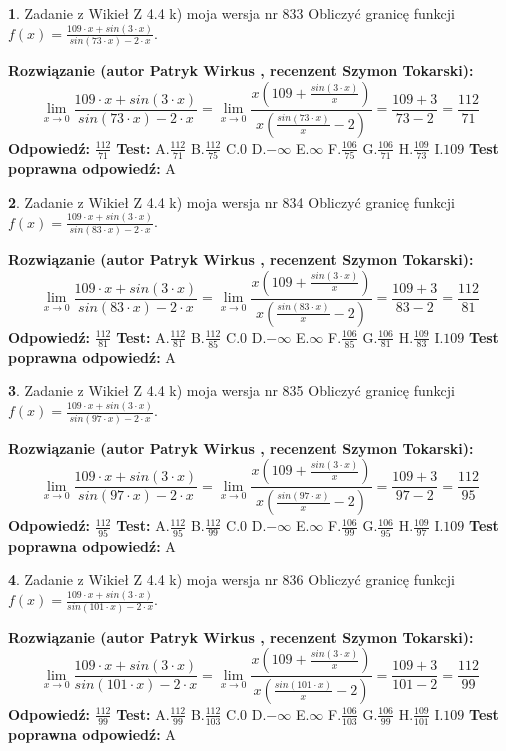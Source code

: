 \documentclass[12pt, a4paper]{article}
\theoremstyle{definition} %
\newtheorem{zad}{}
\newcommand{\zadStart}[1]{\begin{zad}#1\newline}
\newcommand{\zadStop}{\end{zad}}
\newcommand{\rozwStart}[2]{\noindent \textbf{Rozwiązanie (autor #1 , recenzent #2): }\newline}
\newcommand{\rozwStop}{\newline}
\newcommand{\odpStart}{\noindent \textbf{Odpowiedź:}\newline}
\newcommand{\odpStop}{\newline}
\newcommand{\testStart}{\noindent \textbf{Test:}\newline}
\newcommand{\testStop}{\newline}
\newcommand{\kluczStart}{\noindent \textbf{Test poprawna odpowiedź:}\newline}
\newcommand{\kluczStop}{\newline}
\begin{document}
\zadStart{Zadanie z Wikieł Z 4.4 k) moja wersja nr 833}
Obliczyć granicę funkcji $f(x)=\frac{109\cdot x +sin(3\cdot x)}{sin(73\cdot x) -2\cdot x}$.
\zadStop
\rozwStart{Patryk Wirkus}{Szymon Tokarski}
$$\lim\limits_{x\to 0}\frac{109\cdot x +sin(3\cdot x)}{sin(73\cdot x) -2\cdot x}
=\lim\limits_{x\to 0}\frac{x(109+\frac{sin(3\cdot x)}{x})}{x(\frac{sin(73\cdot x)}{x}-2)}
=\frac{109+3}{73-2} = \frac{112}{71}$$
\rozwStop
\odpStart
$\frac{112}{71}$
\odpStop
\testStart
A.$\frac{112}{71}$
B.$\frac{112}{75}$
C.$0$
D.$-\infty$
E.$\infty$
F.$\frac{106}{75}$
G.$\frac{106}{71}$
H.$\frac{109}{73}$
I.$109$
\testStop
\kluczStart
A
\kluczStop



\zadStart{Zadanie z Wikieł Z 4.4 k) moja wersja nr 834}
Obliczyć granicę funkcji $f(x)=\frac{109\cdot x +sin(3\cdot x)}{sin(83\cdot x) -2\cdot x}$.
\zadStop
\rozwStart{Patryk Wirkus}{Szymon Tokarski}
$$\lim\limits_{x\to 0}\frac{109\cdot x +sin(3\cdot x)}{sin(83\cdot x) -2\cdot x}
=\lim\limits_{x\to 0}\frac{x(109+\frac{sin(3\cdot x)}{x})}{x(\frac{sin(83\cdot x)}{x}-2)}
=\frac{109+3}{83-2} = \frac{112}{81}$$
\rozwStop
\odpStart
$\frac{112}{81}$
\odpStop
\testStart
A.$\frac{112}{81}$
B.$\frac{112}{85}$
C.$0$
D.$-\infty$
E.$\infty$
F.$\frac{106}{85}$
G.$\frac{106}{81}$
H.$\frac{109}{83}$
I.$109$
\testStop
\kluczStart
A
\kluczStop



\zadStart{Zadanie z Wikieł Z 4.4 k) moja wersja nr 835}
Obliczyć granicę funkcji $f(x)=\frac{109\cdot x +sin(3\cdot x)}{sin(97\cdot x) -2\cdot x}$.
\zadStop
\rozwStart{Patryk Wirkus}{Szymon Tokarski}
$$\lim\limits_{x\to 0}\frac{109\cdot x +sin(3\cdot x)}{sin(97\cdot x) -2\cdot x}
=\lim\limits_{x\to 0}\frac{x(109+\frac{sin(3\cdot x)}{x})}{x(\frac{sin(97\cdot x)}{x}-2)}
=\frac{109+3}{97-2} = \frac{112}{95}$$
\rozwStop
\odpStart
$\frac{112}{95}$
\odpStop
\testStart
A.$\frac{112}{95}$
B.$\frac{112}{99}$
C.$0$
D.$-\infty$
E.$\infty$
F.$\frac{106}{99}$
G.$\frac{106}{95}$
H.$\frac{109}{97}$
I.$109$
\testStop
\kluczStart
A
\kluczStop



\zadStart{Zadanie z Wikieł Z 4.4 k) moja wersja nr 836}
Obliczyć granicę funkcji $f(x)=\frac{109\cdot x +sin(3\cdot x)}{sin(101\cdot x) -2\cdot x}$.
\zadStop
\rozwStart{Patryk Wirkus}{Szymon Tokarski}
$$\lim\limits_{x\to 0}\frac{109\cdot x +sin(3\cdot x)}{sin(101\cdot x) -2\cdot x}
=\lim\limits_{x\to 0}\frac{x(109+\frac{sin(3\cdot x)}{x})}{x(\frac{sin(101\cdot x)}{x}-2)}
=\frac{109+3}{101-2} = \frac{112}{99}$$
\rozwStop
\odpStart
$\frac{112}{99}$
\odpStop
\testStart
A.$\frac{112}{99}$
B.$\frac{112}{103}$
C.$0$
D.$-\infty$
E.$\infty$
F.$\frac{106}{103}$
G.$\frac{106}{99}$
H.$\frac{109}{101}$
I.$109$
\testStop
\kluczStart
A
\kluczStop
\end{document}
